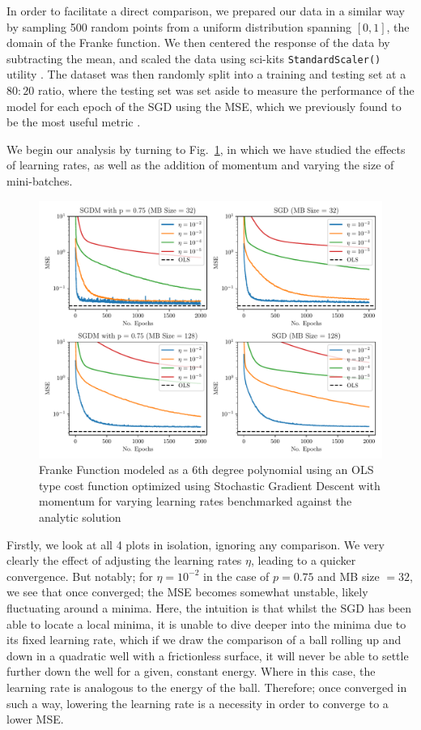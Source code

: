 \documentclass[reprint, english, nofootinbib]{revtex4-2}
\begin{document}
In order to facilitate a direct comparison, we prepared our data in a similar way by sampling 500 random points from a uniform distribution spanning $[0, 1]$, the domain of the Franke function. We then centered the response of the data by subtracting the mean, and scaled the data using sci-kits \lstinline{StandardScaler()} utility \cite{scikit-learn}. The dataset was then randomly split into a training and testing set at a $80:20$ ratio, where the testing set was set aside to measure the performance of the model for each epoch of the SGD using the MSE, which we previously found to be the most useful metric \cite{4155_project_1}.

We begin our analysis by turning to Fig.~\ref{fig: SGD learning rate}, in which we have studied the effects of learning rates, as well as the addition of momentum and varying the size of mini-batches.
\begin{figure}[h!tb]
    \center
    \includegraphics[width=\columnwidth]{SGD_learning_rate.pdf}
    \caption{\label{fig: SGD learning rate}Franke Function modeled as a 6th degree polynomial using an OLS type cost function optimized using Stochastic Gradient Descent with momentum for varying learning rates benchmarked against the analytic solution}
\end{figure}
Firstly, we look at all 4 plots in isolation, ignoring any comparison. We very clearly the effect of adjusting the learning rates $\eta$, leading to a quicker convergence. But notably; for $\eta = 10^{-2}$ in the case of $p=0.75$ and MB size $=32$, we see that once converged; the MSE becomes somewhat unstable, likely fluctuating around a minima. Here, the intuition is that whilst the SGD has been able to locate a local minima, it is unable to dive deeper into the minima due to its fixed learning rate, which if we draw the comparison of a ball rolling up and down in a quadratic well with a frictionless surface, it will never be able to settle further down the well for a given, constant energy. Where in this case, the learning rate is analogous to the energy of the ball. Therefore; once converged in such a way, lowering the learning rate is a necessity in order to converge to a lower MSE.
\end{document}
